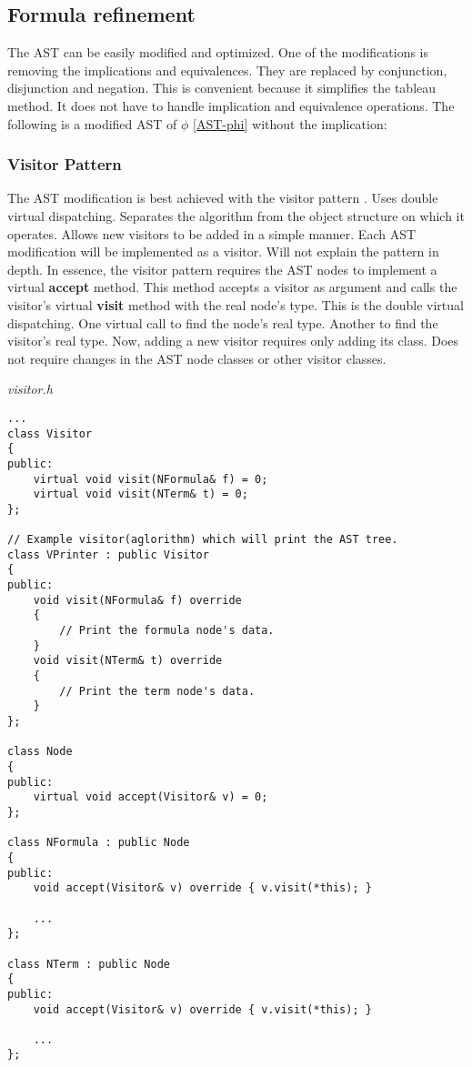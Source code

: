 \documentclass{article}
\begin{document}
	\subsection{Formula refinement}
	The AST can be easily modified and optimized. One of the modifications is removing the implications and equivalences. They are replaced by conjunction, disjunction and negation. This is convenient because it simplifies the tableau method. It does not have to handle implication and equivalence operations. The following is a modified AST of $\phi$ \ref{AST-phi} without the implication:
	

	\subsubsection{Visitor Pattern} The AST modification is best achieved with the visitor pattern \cite{visitor-pattern}. Uses double virtual dispatching. Separates the algorithm from the object structure on which it operates. Allows new visitors to be added in a simple manner. Each AST modification will be implemented as a visitor. Will not explain the pattern in depth. In essence, the visitor pattern requires the AST nodes to implement a virtual \textbf{accept} method. This method accepts a visitor as argument and calls the visitor's virtual \textbf{visit} method with the real node's type. This is the double virtual dispatching. One virtual call to find the node's real type. Another to find the visitor's real type. Now, adding a new visitor requires only adding its class. Does not require changes in the AST node classes or other visitor classes.

\newpage
\noindent
\textit{visitor.h}
\begin{lstlisting}
...
class Visitor
{
public:
    virtual void visit(NFormula& f) = 0;
    virtual void visit(NTerm& t) = 0;
};

// Example visitor(aglorithm) which will print the AST tree.
class VPrinter : public Visitor
{
public:
    void visit(NFormula& f) override
    {
        // Print the formula node's data.
    }
    void visit(NTerm& t) override
    {
        // Print the term node's data.
    }
};

class Node
{
public:
    virtual void accept(Visitor& v) = 0;
};

class NFormula : public Node
{
public:
    void accept(Visitor& v) override { v.visit(*this); }

    ...
};

class NTerm : public Node
{
public:
    void accept(Visitor& v) override { v.visit(*this); }

    ...
};
\end{lstlisting}
\end{document}
